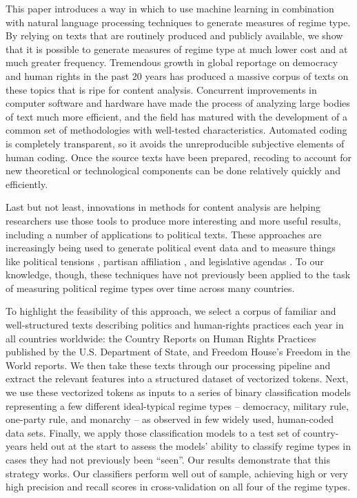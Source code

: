 \documentclass[pdftex,12pt,fullpage,oneside]{amsart}
\begin{document}
This paper introduces a way in which to use machine learning in combination with natural language processing techniques to generate measures of regime type. By relying on texts that are routinely produced and publicly available, we show that it is possible to generate measures of regime type at much lower cost and at much greater frequency. Tremendous growth in global reportage on democracy and human rights in the past 20 years has produced a massive corpus of texts on these topics that is ripe for content analysis. Concurrent improvements in computer software and hardware have made the process of analyzing large bodies of text much more efficient, and the field has matured with the development of a common set of methodologies with well-tested characteristics. Automated coding is completely transparent, so it avoids the unreproducible subjective elements of human coding. Once the source texts have been prepared, recoding to account for new theoretical or technological components can be done relatively quickly and efficiently. 

Last but not least, innovations in methods for content analysis are helping researchers use those tools to produce more interesting and more useful results, including a number of applications to political texts. These approaches are increasingly being used to generate political event data \cite{dorazio:etal:2014,king:lowe:2003,oconnor:etal:2013} and to measure things like political tensions \cite{chadefaux:2014}, partisan affiliation \citep{slapin:proksch:2010,yu:etal:2008}, and legislative agendas \citep{grimmer:2010}. To our knowledge, though, these techniques have not previously been applied to the task of measuring political regime types over time across many countries. 

To highlight the feasibility of this approach, we select a corpus of familiar and well-structured texts describing politics and human-rights practices each year in all countries worldwide: the Country Reports on Human Rights Practices published by the U.S. Department of State, and Freedom House's Freedom in the World reports. We then take these texts through our processing pipeline and extract the relevant features into a structured dataset of vectorized tokens. Next, we use these vectorized tokens as inputs to a series of binary classification models representing a few different ideal-typical regime types -- democracy, military rule, one-party rule, and monarchy -- as observed in few widely used, human-coded data sets. Finally, we apply those classification models to a test set of country-years held out at the start to assess the models' ability to classify regime types in cases they had not previously been ``seen''. Our results demonstrate that this strategy works. Our classifiers perform well out of sample, achieving high or very high precision and recall scores in cross-validation on all four of the regime types. 
\end{document}
